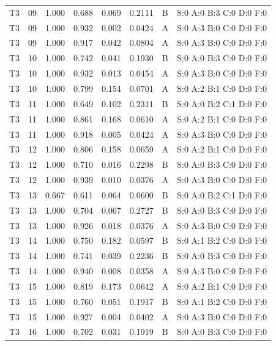\begin{longtable}{lrrrrrll}
T3 & 09 & 1.000 & 0.688 & 0.069 & 0.2111 & B & \tiny S:0 A:0 B:3 C:0 D:0 F:0 \\
T3 & 09 & 1.000 & 0.932 & 0.002 & 0.0424 & A & \tiny S:0 A:3 B:0 C:0 D:0 F:0 \\
T3 & 09 & 1.000 & 0.917 & 0.042 & 0.0804 & A & \tiny S:0 A:3 B:0 C:0 D:0 F:0 \\
T3 & 10 & 1.000 & 0.742 & 0.041 & 0.1930 & B & \tiny S:0 A:0 B:3 C:0 D:0 F:0 \\
T3 & 10 & 1.000 & 0.932 & 0.013 & 0.0454 & A & \tiny S:0 A:3 B:0 C:0 D:0 F:0 \\
T3 & 10 & 1.000 & 0.799 & 0.154 & 0.0701 & A & \tiny S:0 A:2 B:1 C:0 D:0 F:0 \\
T3 & 11 & 1.000 & 0.649 & 0.102 & 0.2311 & B & \tiny S:0 A:0 B:2 C:1 D:0 F:0 \\
T3 & 11 & 1.000 & 0.861 & 0.168 & 0.0610 & A & \tiny S:0 A:2 B:1 C:0 D:0 F:0 \\
T3 & 11 & 1.000 & 0.918 & 0.005 & 0.0424 & A & \tiny S:0 A:3 B:0 C:0 D:0 F:0 \\
T3 & 12 & 1.000 & 0.806 & 0.158 & 0.0659 & A & \tiny S:0 A:2 B:1 C:0 D:0 F:0 \\
T3 & 12 & 1.000 & 0.710 & 0.016 & 0.2298 & B & \tiny S:0 A:0 B:3 C:0 D:0 F:0 \\
T3 & 12 & 1.000 & 0.939 & 0.010 & 0.0376 & A & \tiny S:0 A:3 B:0 C:0 D:0 F:0 \\
T3 & 13 & 0.667 & 0.611 & 0.064 & 0.0600 & B & \tiny S:0 A:0 B:2 C:1 D:0 F:0 \\
T3 & 13 & 1.000 & 0.704 & 0.067 & 0.2727 & B & \tiny S:0 A:0 B:3 C:0 D:0 F:0 \\
T3 & 13 & 1.000 & 0.926 & 0.018 & 0.0376 & A & \tiny S:0 A:3 B:0 C:0 D:0 F:0 \\
T3 & 14 & 1.000 & 0.750 & 0.182 & 0.0597 & B & \tiny S:0 A:1 B:2 C:0 D:0 F:0 \\
T3 & 14 & 1.000 & 0.741 & 0.039 & 0.2236 & B & \tiny S:0 A:0 B:3 C:0 D:0 F:0 \\
T3 & 14 & 1.000 & 0.940 & 0.008 & 0.0358 & A & \tiny S:0 A:3 B:0 C:0 D:0 F:0 \\
T3 & 15 & 1.000 & 0.819 & 0.173 & 0.0642 & A & \tiny S:0 A:2 B:1 C:0 D:0 F:0 \\
T3 & 15 & 1.000 & 0.760 & 0.051 & 0.1917 & B & \tiny S:0 A:1 B:2 C:0 D:0 F:0 \\
T3 & 15 & 1.000 & 0.927 & 0.004 & 0.0402 & A & \tiny S:0 A:3 B:0 C:0 D:0 F:0 \\
T3 & 16 & 1.000 & 0.702 & 0.031 & 0.1919 & B & \tiny S:0 A:0 B:3 C:0 D:0 F:0 \\

\end{longtable}
